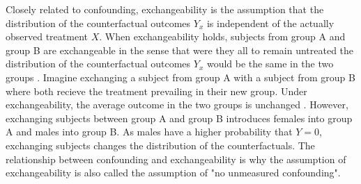 \documentclass[11pt]{article}
\begin{document}
Closely related to confounding, exchangeability is the assumption that
the distribution of the counterfactual outcomes \(Y_{x}\) is independent
of the actually observed treatment \(X\). When exchangeability holds,
subjects from group A and group B are exchangeable in the sense that
were they all to remain untreated the distribution of the counterfactual
outcomes \(Y_{x}\) would be the same in the two groups
\citet{Daniel2013}. Imagine exchanging a subject from group A with a
subject from group B where both recieve the treatment prevailing in
their new group. Under exchangeability, the average outcome in the two
groups is unchanged \citet{HernanMA2018}. However, exchanging subjects
between group A and group B introduces females into group A and males
into group B. As males have a higher probability that \(Y = 0\),
exchanging subjects changes the distribution of the counterfactuals. The
relationship between confounding and exchangeability is why the
assumption of exchangeability is also called the assumption of "no
unmeasured confounding". \linebreak
\end{document}
